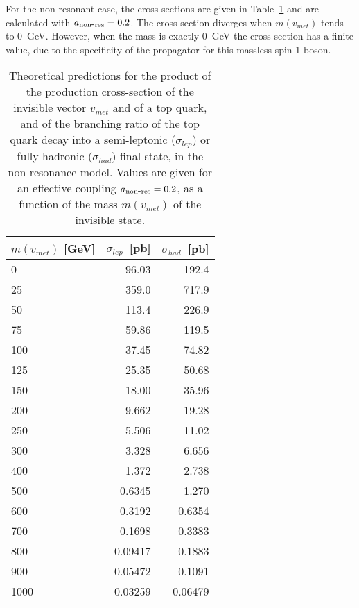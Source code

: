 For the non-resonant case, the cross-sections are given in Table~\ref{tab:S4R_Xsec} and are calculated with $a_{\mathrm{non\mbox{-}res}}=0.2$.
The cross-section diverges when $m(v_{met})$ tends to 0~GeV.  However, when the mass is exactly 0~GeV the cross-section has a finite value,
due to the specificity of the propagator for this massless spin-1 boson.
\begin{table}[!htb]\centering
\begin{tabular}{l|r|r}
\hline \hline
$m(v_{met})$ [GeV] & $\sigma_{lep}$~[pb] & $\sigma_{had}$~[pb] \\
\hline \hline
0                  &  96.03              & 192.4    \\
25                 &  359.0              & 717.9    \\
50                 &  113.4              & 226.9    \\
75                 &  59.86              & 119.5    \\
100                &  37.45              & 74.82    \\
125                &  25.35              & 50.68    \\
150                &  18.00              & 35.96    \\
200                &  9.662              & 19.28    \\
250                &  5.506              & 11.02    \\
300                &  3.328              & 6.656    \\
400                &  1.372              & 2.738    \\
500                &  0.6345             & 1.270    \\
600                &  0.3192             & 0.6354   \\
700                &  0.1698             & 0.3383   \\
800                &  0.09417            & 0.1883   \\
900                &  0.05472            & 0.1091   \\
1000               &  0.03259            & 0.06479  \\
\hline \hline
\end{tabular}
\caption
{
Theoretical predictions for the product of the production cross-section of the invisible vector $v_{met}$ and of a top quark,
and of the branching ratio of the top quark decay into a semi-leptonic ($\sigma_{lep}$) or fully-hadronic ($\sigma_{had}$) final state, 
in the non-resonance model.
Values are given for an effective coupling $a_{\mathrm{non\mbox{-}res}}=0.2$, as a function of the mass $m(v_{met})$ of the invisible state.
}
\label{tab:S4R_Xsec}
\end{table}

